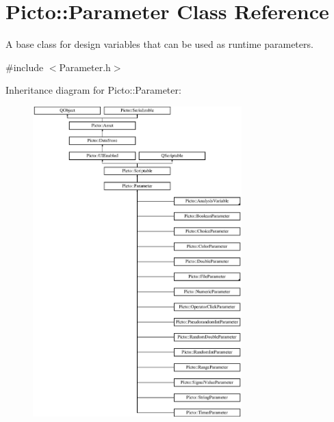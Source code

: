 \hypertarget{class_picto_1_1_parameter}{\section{Picto\-:\-:Parameter Class Reference}
\label{class_picto_1_1_parameter}
}


A base class for design variables that can be used as runtime parameters.  




{\ttfamily \#include $<$Parameter.\-h$>$}

Inheritance diagram for Picto\-:\-:Parameter\-:\begin{figure}[H]
\begin{center}
\leavevmode
\includegraphics[height=12.000000cm]{class_picto_1_1_parameter}
\end{center}
\end{figure}

